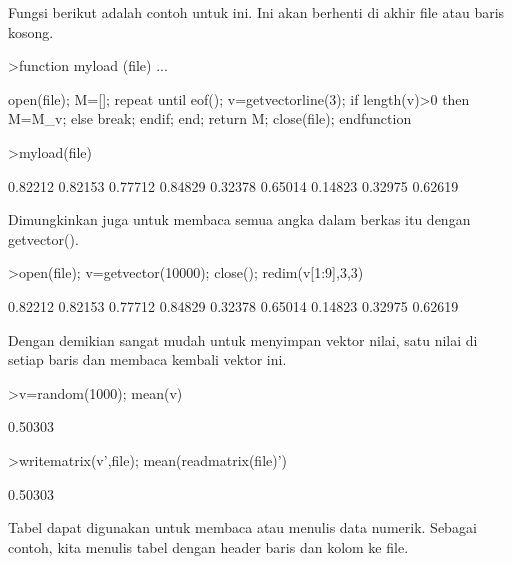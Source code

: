 \documentclass[a4paper,10pt]{article}
\begin{document}
\begin{eulernotebook}
\begin{eulercomment}
\begin{eulercomment}
\begin{eulercomment}
\begin{eulercomment}
\begin{eulercomment}
\begin{eulercomment}
\begin{eulercomment}
Fungsi berikut adalah contoh untuk ini. Ini akan berhenti di akhir
file atau baris kosong.
\end{eulercomment}
\begin{eulerprompt}
>function myload (file) ...
\end{eulerprompt}
\begin{eulerudf}
  open(file);
  M=[];
  repeat
     until eof();
     v=getvectorline(3);
     if length(v)>0 then M=M_v; else break; endif;
  end;
  return M;
  close(file);
  endfunction
\end{eulerudf}
\begin{eulerprompt}
>myload(file)
\end{eulerprompt}
\begin{euleroutput}
    0.82212   0.82153   0.77712 
    0.84829   0.32378   0.65014 
    0.14823   0.32975   0.62619 
\end{euleroutput}
\begin{eulercomment}
Dimungkinkan juga untuk membaca semua angka dalam berkas itu dengan
getvector().
\end{eulercomment}
\begin{eulerprompt}
>open(file); v=getvector(10000); close(); redim(v[1:9],3,3)
\end{eulerprompt}
\begin{euleroutput}
    0.82212   0.82153   0.77712 
    0.84829   0.32378   0.65014 
    0.14823   0.32975   0.62619 
\end{euleroutput}
\begin{eulercomment}
Dengan demikian sangat mudah untuk menyimpan vektor nilai, satu nilai
di setiap baris dan membaca kembali vektor ini.
\end{eulercomment}
\begin{eulerprompt}
>v=random(1000); mean(v)
\end{eulerprompt}
\begin{euleroutput}
  0.50303
\end{euleroutput}
\begin{eulerprompt}
>writematrix(v',file); mean(readmatrix(file)')
\end{eulerprompt}
\begin{euleroutput}
  0.50303
\end{euleroutput}
\begin{eulercomment}
Tabel dapat digunakan untuk membaca atau menulis data numerik. Sebagai
contoh, kita menulis tabel dengan header baris dan kolom ke file.
\end{eulercomment}

\end{eulercomment}
\end{eulercomment}
\end{eulercomment}
\end{eulercomment}
\end{eulercomment}
\end{eulercomment}
\end{eulernotebook}
\end{document}
